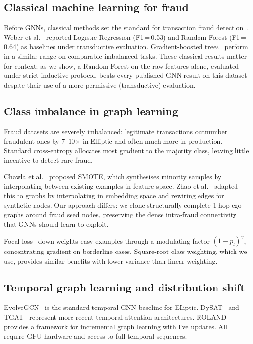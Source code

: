 \subsection{Classical machine learning for fraud}

Before GNNs, classical methods set the standard for transaction fraud
detection~\citep{ngai2011fraudreview,hilal2022fraud}.  Weber et
al.~\citep{weber2019} reported Logistic Regression (F1\,=\,0.53) and
Random Forest (F1\,=\,0.64) as baselines under transductive evaluation.
Gradient-boosted trees~\citep{chen2016xgboost} perform in a similar
range on comparable imbalanced tasks.  These classical results matter
for context: as we show, a Random Forest on the raw features alone,
evaluated under strict-inductive protocol, beats every published GNN
result on this dataset despite their use of a more permissive
(transductive) evaluation.

\subsection{Class imbalance in graph learning}

Fraud datasets are severely imbalanced: legitimate transactions
outnumber fraudulent ones by 7--10$\times$ in Elliptic and often much
more in production.  Standard cross-entropy allocates most gradient to
the majority class, leaving little incentive to detect rare fraud.

Chawla et al.~\citep{chawla2002smote} proposed SMOTE, which
synthesises minority samples by interpolating between existing
examples in feature space.  Zhao et
al.~\citep{zhao2021graphsmote} adapted this to graphs by
interpolating in embedding space and rewiring edges for synthetic
nodes.  Our approach differs: we clone structurally complete 1-hop
ego-graphs around fraud seed nodes, preserving the dense intra-fraud
connectivity that GNNs should learn to exploit.

Focal loss~\citep{lin2017focal} down-weights easy examples through a
modulating factor $(1-p_t)^\gamma$, concentrating gradient on
borderline cases.  Square-root class weighting, which we use, provides
similar benefits with lower variance than linear weighting.

\subsection{Temporal graph learning and distribution shift}

\begin{sloppypar}
EvolveGCN~\citep{pareja2020evolvegcn} is the standard temporal GNN
baseline for Elliptic.  DySAT~\citep{sankar2020} and
TGAT~\citep{xu2020inductive} represent more recent temporal attention
architectures.  ROLAND~\citep{you2022roland} provides a framework for
incremental graph learning with live updates.  All require GPU
hardware and access to full temporal sequences.
\end{sloppypar}

